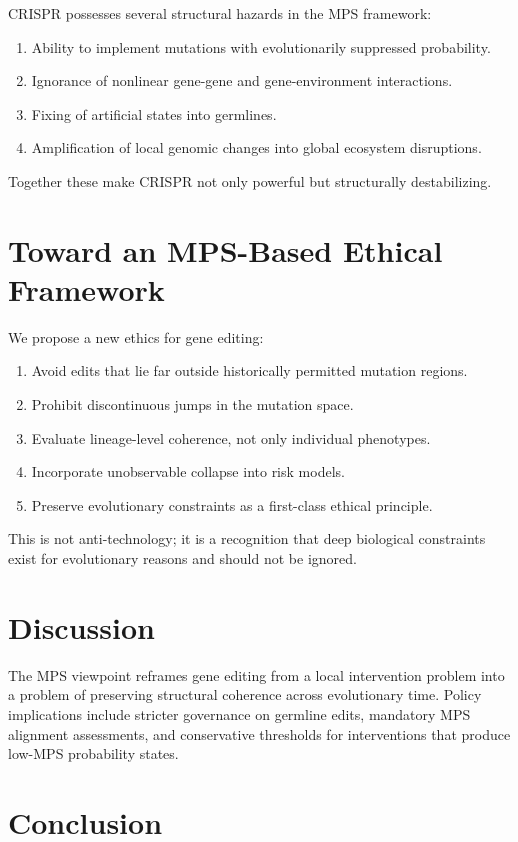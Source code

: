 \documentclass[11pt]{article}
\begin{document}
CRISPR possesses several structural hazards in the MPS framework:
\begin{enumerate}
    \item Ability to implement mutations with evolutionarily suppressed probability.
    \item Ignorance of nonlinear gene-gene and gene-environment interactions.
    \item Fixing of artificial states into germlines.
    \item Amplification of local genomic changes into global ecosystem disruptions.
\end{enumerate}

Together these make CRISPR not only powerful but structurally destabilizing.

\section{Toward an MPS-Based Ethical Framework}

We propose a new ethics for gene editing:
\begin{enumerate}
    \item Avoid edits that lie far outside historically permitted mutation regions.
    \item Prohibit discontinuous jumps in the mutation space.
    \item Evaluate lineage-level coherence, not only individual phenotypes.
    \item Incorporate unobservable collapse into risk models.
    \item Preserve evolutionary constraints as a first-class ethical principle.
\end{enumerate}

This is not anti-technology; it is a recognition that deep biological constraints exist for evolutionary reasons and should not be ignored.

\section{Discussion}

The MPS viewpoint reframes gene editing from a local intervention problem into a problem of preserving structural coherence across evolutionary time. Policy implications include stricter governance on germline edits, mandatory MPS alignment assessments, and conservative thresholds for interventions that produce low-MPS probability states.

\section{Conclusion}
\end{document}
